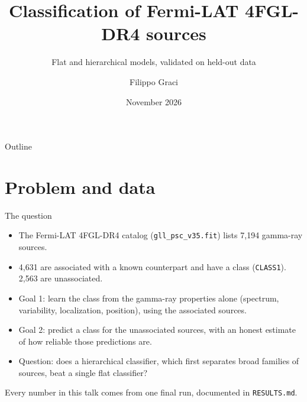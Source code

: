 \documentclass[aspectratio=169, 10pt]{beamer}
\title[Fermi 4FGL classification]{Classification of Fermi-LAT 4FGL-DR4 sources}
\subtitle{Flat and hierarchical models, validated on held-out data}
\author[F. Graci]{Filippo Graci}
\institute[UniPV]{Università di Pavia}
\date{November 2026}
\newcommand{\cls}[1]{\texttt{#1}}
\begin{document}
\begin{frame}
  \titlepage
\end{frame}

\begin{frame}{Outline}
  \tableofcontents
\end{frame}

\section{Problem and data}

\begin{frame}{The question}
  \begin{itemize}
    \item The Fermi-LAT 4FGL-DR4 catalog (\cls{gll\_psc\_v35.fit}) lists 7,194 gamma-ray sources.
    \item 4,631 are associated with a known counterpart and have a class (\cls{CLASS1}).
          2,563 are unassociated.
    \item Goal 1: learn the class from the gamma-ray properties alone (spectrum, variability,
          localization, position), using the associated sources.
    \item Goal 2: predict a class for the unassociated sources, with an honest estimate of how
          reliable those predictions are.
    \item Question: does a hierarchical classifier, which first separates broad families of
          sources, beat a single flat classifier?
  \end{itemize}
  \vspace{0.3cm}
  \small Every number in this talk comes from one final run, documented in \cls{RESULTS.md}.
\end{frame}
\end{document}
